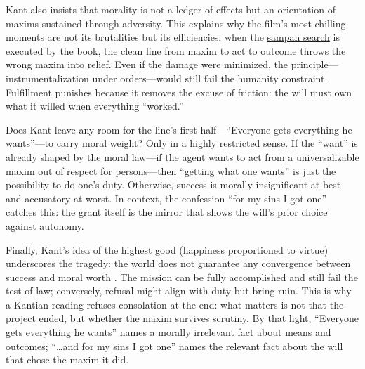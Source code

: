 Kant also insists that morality is not a ledger of effects but an orientation of maxims
sustained through adversity. This explains why the film's most chilling moments are not its
brutalities but its efficiencies: when the \hyperref[scene:sampan]{sampan search} is executed
by the book, the clean line from maxim to act to outcome throws the wrong maxim into relief.
Even if the damage were minimized, the principle—instrumentalization under orders—would still
fail the humanity
constraint. Fulfillment punishes because it removes the excuse of friction: the will must own
what it willed when everything ``worked.''

Does Kant leave any room for the line's first half—``Everyone gets everything he wants''—to
carry moral weight? Only in a highly restricted sense. If the ``want'' is already shaped by
the moral law—if the agent wants to act from a universalizable maxim out of respect for
persons—then ``getting what one wants'' is just the possibility to do one's duty. Otherwise,
success is morally insignificant at best and accusatory at worst. In context, the confession
``for my sins I got one'' catches this: the grant itself is the mirror that shows the will's
prior choice against autonomy.

Finally, Kant's idea of the highest good (happiness proportioned to virtue) underscores the
tragedy: the world does not guarantee any convergence between success and moral worth
\parencite[pp.~125--131]{KantCPrR1996}. The mission can be fully accomplished and still fail
the test of law; conversely, refusal might align with duty but bring ruin. This is why a
Kantian reading refuses consolation at the end: what matters is not that the project ended,
but whether the maxim survives scrutiny. By that light, ``Everyone gets everything he wants''
names a morally irrelevant fact about means and outcomes; ``\ldots and for my sins I got one''
names the relevant fact about the will that chose the maxim it did.
